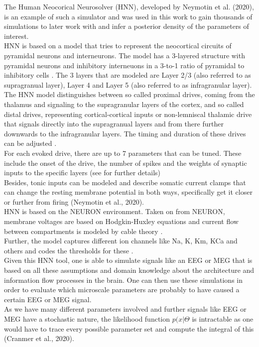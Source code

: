 \documentclass[12pt]{report}
\begin{document}
The Human Neocorical Neurosolver (HNN), developed by Neymotin et al. (2020), is an example of such a simulator and was used in this work to gain thousands of simulations to later work with and infer a posterior density of the parameters of interest. \\
HNN is based on a model that tries to represent the neocortical circuits of pyramidal neurons and interneurons. The model has a 3-layered structure with pyramidal neurons and inhibitory interneuons in a 3-to-1 ratio of pyramidal to inhibitory cells \citet{neymotin2020human}. The 3 layers that are modeled are Layer 2/3 (also referred to as supragranual layer), Layer 4 and Layer 5 (also referred to as infragranular layer). \\
The HNN model distinguishes between so called proximal drives, coming from the thalamus and signaling to the supragranular layers of the cortex, and so called distal drives, representing cortical-cortical inputs or non-lemniscal thalamic drive that signals directly into the supragranual layers and from there further downwards to the infragranular layers. The timing and duration of these drives can be adjusted \citet{neymotin2020human}. \\
For each evoked drive, there are up to 7 parameters that can be tuned. These include the onset of the drive, the number of spikes and the weights of synaptic inputs to the specific layers (see \cite{neymotin2020human} for further details)\\
Besides, tonic inputs can be modeled and describe somatic current clamps that can change the resting membrane potential in both ways, specifically get it closer or further from firing (Neymotin et al., 2020). \\


HNN is based on the NEURON environment. Taken on from NEURON, membrane voltages are based on Hodgkin-Huxley equations and current flow between compartments is modeled by cable theory \citet{neymotin2020human}. \\
Further, the model captures different ion channels like Na, K, Km, KCa and others and codes the thresholds for these \citet{neymotin2020human}. \\

Given this HNN tool, one is able to simulate signals like an EEG or MEG that is based on all these assumptions and domain knowledge about the architecture and information flow processes in the brain. 
One can then use these simulations in order to evaluate which microscale parameters are probably to have caused a certain EEG or MEG signal. \\

As we have many different parameters involved and further signals like EEG or MEG have a stochastic nature, the likelihood function $p(x|\Theta$ is intractable as one would have to trace every possible parameter set and compute the integral of this (Cranmer et al., 2020). 





\end{document}
